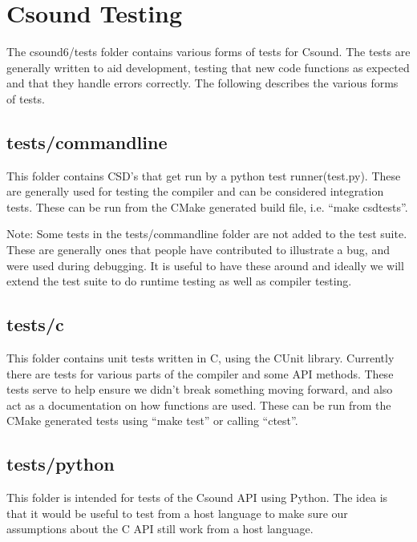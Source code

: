 \documentclass[]{book}
\begin{document}
\section{Csound Testing}

The csound6/tests folder contains various forms of tests for Csound. The
tests are generally written to aid development, testing that new code
functions as expected and that they handle errors correctly. The
following describes the various forms of tests.

\subsection{tests/commandline}

This folder contains CSD's that get run by a python test
runner(test.py). These are generally used for testing the compiler and
can be considered integration tests. These can be run from the CMake
generated build file, i.e. ``make csdtests''.

Note: Some tests in the tests/commandline folder are not added to the
test suite. These are generally ones that people have contributed to
illustrate a bug, and were used during debugging. It is useful to have
these around and ideally we will extend the test suite to do runtime
testing as well as compiler testing.

\subsection{tests/c}

This folder contains unit tests written in C, using the CUnit library.
Currently there are tests for various parts of the compiler and some API
methods. These tests serve to help ensure we didn't break something
moving forward, and also act as a documentation on how functions are
used. These can be run from the CMake generated tests using ``make
test'' or calling ``ctest''.

\subsection{tests/python}

This folder is intended for tests of the Csound API using Python. The
idea is that it would be useful to test from a host language to make
sure our assumptions about the C API still work from a host language.
\end{document}
